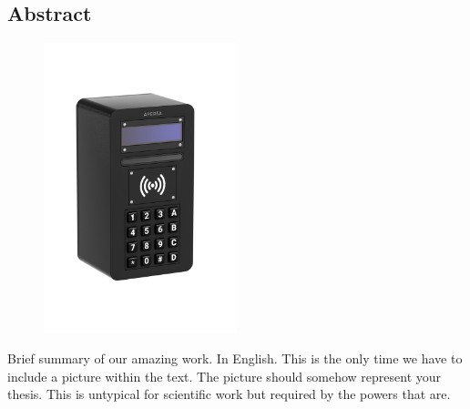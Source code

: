 \begin{spacing}{1}
    \chapter*{Abstract}
\end{spacing}
\begin{figure}
    \begin{center}
      \includegraphics[width=0.5\textwidth]{pics/all-in-package.png}
    \end{center}
\end{figure}
Brief summary of our amazing work. In English.
This is the only time we have to include a picture within the text.
The picture should somehow represent your thesis.
This is untypical for scientific work but required by the powers that are.


